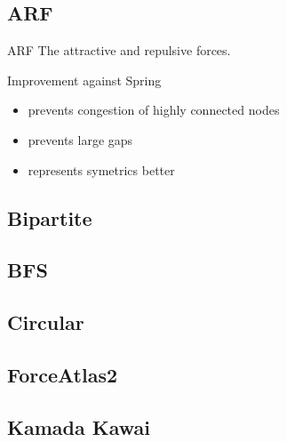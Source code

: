 \documentclass[11pt]{beamer}
\begin{document}
\subsection{ARF}
\begin{frame}{\subsecname}

    \begin{block}{ARF}
        The attractive and repulsive forces.
    \end{block}

    \pause
    \begin{block}{Improvement against Spring}
        \begin{itemize}
            \pause
            \item prevents congestion of highly connected nodes
            \pause
            \item prevents large gaps
            \pause
            \item represents symetrics better
        \end{itemize}
    \end{block}

\end{frame}

\subsection{Bipartite}
\begin{frame}{\subsecname}
\end{frame}

\subsection{BFS}
\begin{frame}{\subsecname}
\end{frame}

\subsection{Circular}
\begin{frame}{\subsecname}
\end{frame}

\subsection{ForceAtlas2}
\begin{frame}{\subsecname}
\end{frame}

\subsection{Kamada Kawai}
\begin{frame}{\subsecname}
\end{frame}
\end{document}
